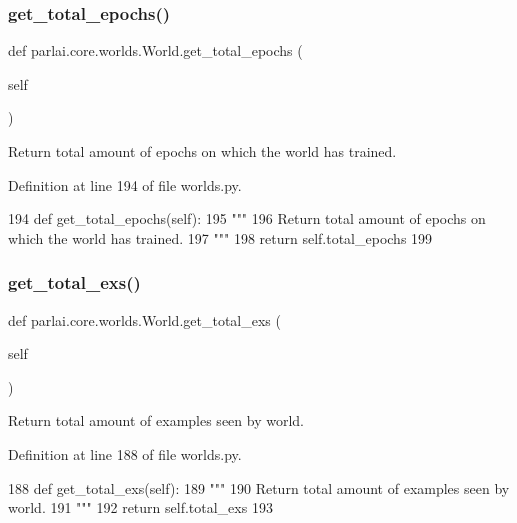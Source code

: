 \subsubsection{\texorpdfstring{get\+\_\+total\+\_\+epochs()}{get\_total\_epochs()}}
{\footnotesize\ttfamily def parlai.\+core.\+worlds.\+World.\+get\+\_\+total\+\_\+epochs (\begin{DoxyParamCaption}\item[{}]{self }\end{DoxyParamCaption})}

\begin{DoxyVerb}Return total amount of epochs on which the world has trained.
\end{DoxyVerb}
 

Definition at line 194 of file worlds.\+py.


\begin{DoxyCode}
194     \textcolor{keyword}{def }get\_total\_epochs(self):
195         \textcolor{stringliteral}{"""}
196 \textcolor{stringliteral}{        Return total amount of epochs on which the world has trained.}
197 \textcolor{stringliteral}{        """}
198         \textcolor{keywordflow}{return} self.total\_epochs
199 
\end{DoxyCode}
\mbox{\label{classparlai_1_1core_1_1worlds_1_1World_a0f9926a92069bfb833a6c4a531d99b70}} 
\subsubsection{\texorpdfstring{get\+\_\+total\+\_\+exs()}{get\_total\_exs()}}
{\footnotesize\ttfamily def parlai.\+core.\+worlds.\+World.\+get\+\_\+total\+\_\+exs (\begin{DoxyParamCaption}\item[{}]{self }\end{DoxyParamCaption})}

\begin{DoxyVerb}Return total amount of examples seen by world.
\end{DoxyVerb}
 

Definition at line 188 of file worlds.\+py.


\begin{DoxyCode}
188     \textcolor{keyword}{def }get\_total\_exs(self):
189         \textcolor{stringliteral}{"""}
190 \textcolor{stringliteral}{        Return total amount of examples seen by world.}
191 \textcolor{stringliteral}{        """}
192         \textcolor{keywordflow}{return} self.total\_exs
193 
\end{DoxyCode}
\mbox{\label{classparlai_1_1core_1_1worlds_1_1World_a5ef8bd0bc50edb86ef87e4a3e72b6192}} 
